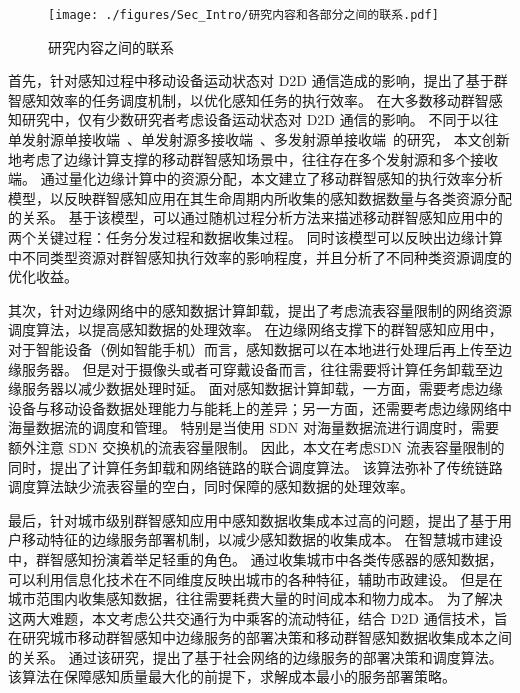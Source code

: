 \begin{figure}[!h]
  \centering
  \texttt{[image: ./figures/Sec\_Intro/研究内容和各部分之间的联系.pdf]}
  \caption{研究内容之间的联系}
  \vspace{-1em}
  \label{Figure_Re_Part}
\end{figure}

首先，针对感知过程中移动设备运动状态对 D2D 通信造成的影响，提出了基于群智感知效率的任务调度机制，以优化感知任务的执行效率。
在大多数移动群智感知研究中，仅有少数研究者考虑设备运动状态对 D2D 通信的影响。
不同于以往单发射源单接收端~\cite{DBLP:journals/twc/LiW14}、单发射源多接收端~\cite{DBLP:conf/wasa/Yan0WWW17}、多发射源单接收端~\cite{DBLP:journals/tpds/ZhaoMTL15}的研究，
本文创新地考虑了边缘计算支撑的移动群智感知场景中，往往存在多个发射源和多个接收端。
通过量化边缘计算中的资源分配，本文建立了移动群智感知的执行效率分析模型，以反映群智感知应用在其生命周期内所收集的感知数据数量与各类资源分配的关系。
基于该模型，可以通过随机过程分析方法来描述移动群智感知应用中的两个关键过程：任务分发过程和数据收集过程。
同时该模型可以反映出边缘计算中不同类型资源对群智感知执行效率的影响程度，并且分析了不同种类资源调度的优化收益。

其次，针对边缘网络中的感知数据计算卸载，提出了考虑流表容量限制的网络资源调度算法，以提高感知数据的处理效率。
在边缘网络支撑下的群智感知应用中，对于智能设备（例如智能手机）而言，感知数据可以在本地进行处理后再上传至边缘服务器。
但是对于摄像头或者可穿戴设备而言，往往需要将计算任务卸载至边缘服务器以减少数据处理时延。
面对感知数据计算卸载，一方面，需要考虑边缘设备与移动设备数据处理能力与能耗上的差异；另一方面，还需要考虑边缘网络中海量数据流的调度和管理。
特别是当使用 SDN 对海量数据流进行调度时，需要额外注意 SDN 交换机的流表容量限制。
因此，本文在考虑SDN 流表容量限制的同时，提出了计算任务卸载和网络链路的联合调度算法。
该算法弥补了传统链路调度算法缺少流表容量的空白，同时保障的感知数据的处理效率。

最后，针对城市级别群智感知应用中感知数据收集成本过高的问题，提出了基于用户移动特征的边缘服务部署机制，以减少感知数据的收集成本。
在智慧城市建设中，群智感知扮演着举足轻重的角色。
通过收集城市中各类传感器的感知数据，可以利用信息化技术在不同维度反映出城市的各种特征，辅助市政建设。
但是在城市范围内收集感知数据，往往需要耗费大量的时间成本和物力成本。
为了解决这两大难题，本文考虑公共交通行为中乘客的流动特征，结合 D2D 通信技术，旨在研究城市移动群智感知中边缘服务的部署决策和移动群智感知数据收集成本之间的关系。
通过该研究，提出了基于社会网络的边缘服务的部署决策和调度算法。
该算法在保障感知质量最大化的前提下，求解成本最小的服务部署策略。

